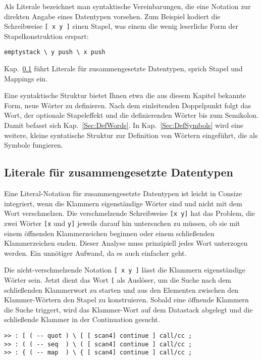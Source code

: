 Als Literale bezeichnet man syntaktische Vereinbarungen, die eine Notation zur direkten Angabe eines Datentypen vorsehen. Zum Beispiel kodiert die Schreibweise \verb|[ x y ]| einen Stapel, was einem die wenig leserliche Form der Stapelkonstruktion erspart:

\begin{verbatim}
emptystack \ y push \ x push
\end{verbatim}

Kap.~\ref{Sec:Literale} führt Literale für zusammengesetzte Datentypen, sprich Stapel und Mappings ein.

Eine syntaktische Struktur bietet Ihnen etwa die aus diesem Kapitel bekannte Form, neue Wörter zu definieren. Nach dem einleitenden Doppelpunkt folgt das Wort, der optionale Stapeleffekt und die definierenden Wörter bis zum Semikolon. Damit befasst sich Kap.~\ref{Sec:DefWords}. In Kap.~\ref{Sec:DefSymbols} wird eine weitere, kleine syntatische Struktur zur Definition von Wörtern eingeführt, die als Symbole fungieren.

\subsection{Literale für zusammengesetzte Datentypen}
\label{Sec:Literale}

Eine Literal-Notation für zusammengesetzte Datentypen ist leicht in Consize integriert, wenn die Klammern eigenständige Wörter sind und nicht mit dem Wort verschmelzen. Die verschmelzende Schreibweise \verb|[x y]| hat das Problem, die zwei Wörter \verb|[x| und \verb|y]| jeweils darauf hin untersuchen zu müssen, ob sie mit einem öffnenden Klammerzeichen beginnen oder einem schließenden Klammerzeichen enden. Dieser Analyse muss prinzipiell jedes Wort unterzogen werden. Ein unnötiger Aufwand, da es auch einfacher geht.

Die nicht-verschmelzende Notation \verb|[ x y ]| lässt die Klammern eigen\-stän\-di\-ge Wörter sein. Jetzt dient das Wort \verb|[| als Auslöser, um die Suche nach dem schließenden Klammerwort zu starten und aus den Elementen zwischen den Klammer-Wörtern den Stapel zu konstruieren. Sobald eine öffnende Klammern die Suche triggert, wird das Klammer-Wort auf dem Datastack abgelegt und die schließende Klammer in der Continuation gesucht. 

\begin{verbatim}
>> : [ ( -- quot ) \ [ [ scan4] continue ] call/cc ;
>> : ( ( -- seq  ) \ ( [ scan4] continue ] call/cc ;
>> : { ( -- map  ) \ { [ scan4] continue ] call/cc ;
\end{verbatim}

